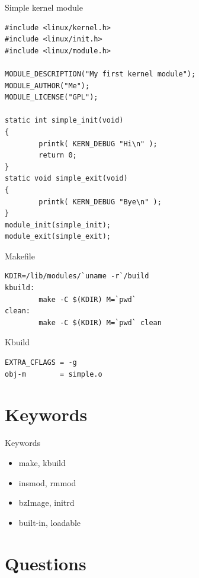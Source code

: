 \documentclass{workshop}
\begin{document}
\begin{frame}[fragile]{Simple kernel module}
\begin{verbatim}#include <linux/kernel.h>
#include <linux/init.h>
#include <linux/module.h>

MODULE_DESCRIPTION("My first kernel module");
MODULE_AUTHOR("Me");
MODULE_LICENSE("GPL");

static int simple_init(void)
{
        printk( KERN_DEBUG "Hi\n" );
        return 0;
}
static void simple_exit(void)
{
        printk( KERN_DEBUG "Bye\n" );
}
module_init(simple_init);
module_exit(simple_exit);
\end{verbatim}
\end{frame}

\begin{frame}[fragile]{Makefile}
\begin{verbatim}
KDIR=/lib/modules/`uname -r`/build
kbuild:
        make -C $(KDIR) M=`pwd`
clean:
        make -C $(KDIR) M=`pwd` clean
\end{verbatim}
\end{frame}




\begin{frame}[fragile]{Kbuild}
\begin{verbatim}
EXTRA_CFLAGS = -g
obj-m        = simple.o
\end{verbatim}
\end{frame}




\section{Keywords}

\begin{frame}{Keywords}
      \begin{itemize}
        \item make, kbuild
	\item insmod, rmmod
	\item bzImage, initrd
	\item built-in, loadable
      \end{itemize}
\end{frame}

\section{Questions}
\end{document}
